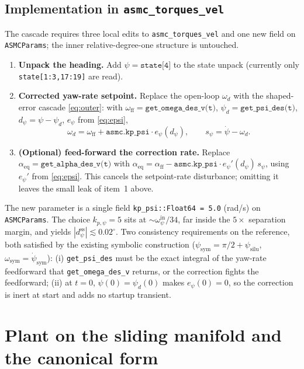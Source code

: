 \documentclass[11pt]{article}
\theoremstyle{plain}
\theoremstyle{definition}
\begin{document}
\subsection{Implementation in \texttt{asmc\_torques\_vel}}
\label{sec:impl}
The cascade requires three local edits to \texttt{asmc\_torques\_vel} and one new field
on \texttt{ASMCParams}; the inner relative-degree-one structure is untouched.
\begin{enumerate}[leftmargin=2em]
\item \textbf{Unpack the heading.} Add $\psi=\texttt{state[4]}$ to the state unpack
(currently only \texttt{state[1:3,17:19]} are read).
\item \textbf{Corrected yaw-rate setpoint.} Replace the open-loop $\omega_d$ with the
shaped-error cascade \eqref{eq:outer}: with $\omega_{\mathrm{ff}}=
\texttt{get\_omega\_des\_v(t)}$, $\psi_d=\texttt{get\_psi\_des(t)}$,
$d_\psi=\psi-\psi_d$, $e_\psi$ from \eqref{eq:epsi},
\[
\omega_d=\omega_{\mathrm{ff}}+\texttt{asmc.kp\_psi}\cdot e_\psi(d_\psi),
\qquad s_\psi=\dot\psi-\omega_d .
\]
\item \textbf{(Optional) feed-forward the correction rate.} Replace
$\alpha_{\mathrm{eq}}=\texttt{get\_alpha\_des\_v(t)}$ with
$\alpha_{\mathrm{eq}}=\alpha_{\mathrm{ff}}-\texttt{asmc.kp\_psi}\cdot
e_\psi'(d_\psi)\,s_\psi$, using $e_\psi'$ from \eqref{eq:epsi}. This cancels the
setpoint-rate disturbance; omitting it leaves the small leak of item~1 above.
\end{enumerate}
The new parameter is a single field \texttt{kp\_psi::Float64 = 5.0} (rad/s) on
\texttt{ASMCParams}. The choice $k_{p,\psi}=5$ sits at $\sim\!\omega^{\mathrm{in}}_\psi/34$,
far inside the $5\times$ separation margin, and yields $|d_\psi^{\mathrm{ss}}|\lesssim
0.02^\circ$. Two consistency requirements on the reference, both satisfied by the
existing symbolic construction ($\psi_{\mathrm{sym}}=\pi/2+\psi_{\mathrm{silu}}$,
$\omega_{\mathrm{sym}}=\dot\psi_{\mathrm{sym}}$): (i) \texttt{get\_psi\_des} must be the
exact integral of the yaw-rate feedforward that \texttt{get\_omega\_des\_v} returns, or
the correction fights the feedforward; (ii) at $t=0$, $\psi(0)=\psi_d(0)$ makes
$e_\psi(0)=0$, so the correction is inert at start and adds no startup transient.

\section{Plant on the sliding manifold and the canonical form}
\label{sec:plant}
\end{document}
